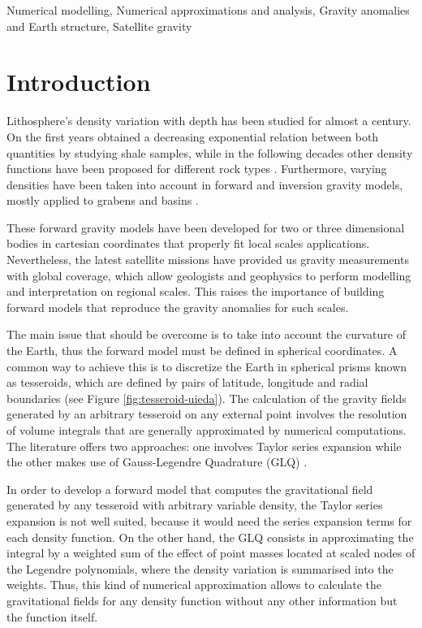 \documentclass[extra]{gji}
\begin{document}
\begin{keywords}
Numerical modelling, Numerical approximations and analysis, Gravity anomalies 
and Earth structure, Satellite gravity
\end{keywords}


\section{Introduction}

Lithosphere's density variation with depth has been studied for almost a 
century.
On the first years \citet{Athy1930} obtained a decreasing exponential relation 
between both quantities by studying shale samples, while in the following 
decades other density functions have been proposed for different rock types 
\citep[e.g.,][]{Maxant1980, Rao1986, Rao1993, Rao1994}. 
Furthermore, varying densities have been taken into account in forward and 
inversion gravity models, mostly applied to grabens and basins 
\citep{Cordell1973, Rao1986, Cowie1990, Rao1993, Rao1994, Zhang2001, 
Welford2010}.

These forward gravity models have been developed for two or three dimensional 
bodies in cartesian coordinates that properly fit local scales applications. 
Nevertheless, the latest satellite missions have provided us gravity 
measurements with global coverage, which allow geologists and geophysics to 
perform modelling and interpretation on regional scales. This raises the 
importance of building forward models that reproduce the gravity anomalies for 
such scales.

The main issue that should be overcome is to take into account the curvature 
of the Earth, thus the forward model must be defined in spherical coordinates. 
A common way to achieve this is to discretize the Earth in spherical prisms 
known as tesseroids, which are defined by pairs of latitude, longitude and 
radial boundaries (see Figure \ref{fig:tesseroid-uieda}).
The calculation of the gravity fields generated by an arbitrary tesseroid on 
any external point involves the resolution of volume integrals that are 
generally approximated by numerical computations.
The literature offers two approaches: one involves Taylor series expansion 
\citep{Heck2007, Grombein2013} while the other makes use of Gauss-Legendre 
Quadrature (GLQ) \citep{Asgharzadeh2007, Uieda2016, Uieda2017}.

In order to develop a forward model that computes the gravitational 
field generated by any tesseroid with arbitrary variable density, the 
Taylor series expansion is not well suited, because it would need the 
series expansion terms for each density function.
On the other hand, the GLQ consists in approximating the integral by a 
weighted sum of the effect of point masses located at scaled nodes of the 
Legendre polynomials, where the density variation is summarised into the 
weights.
Thus, this kind of numerical approximation allows to calculate the 
gravitational fields for any density function without any other 
information but the function itself.
\end{document}
